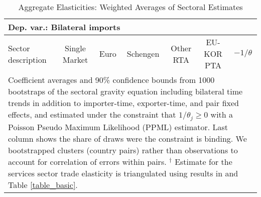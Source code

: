 \documentclass[a4paper,12pt]{article}
\begin{document}
\begin{appendix}
\renewcommand{\tabcolsep}{.2cm}


\begin{table}[t]
\caption{Aggregate Elasticities: Weighted Averages of Sectoral Estimates}
\label{table_wagg}\centering \vspace*{0.5cm}
{\scriptsize
\hspace*{-2cm}\begin{tabular}{lcccccc}
\multicolumn{4}{l}{Dep. var.: Bilateral imports}\\
\toprule
Sector description & Single Market & Euro & Schengen & Other RTA & EU-KOR PTA &  $-1/\theta$\\
\midrule

\bottomrule
\multicolumn{7}{l}{\parbox[t]{5.3in}{Coefficient averages and 90\% confidence bounds from 1000 bootstraps of the sectoral gravity equation including bilateral time trends in addition to importer-time, exporter-time, and pair fixed effects, and estimated under the constraint that $1/\theta_j\geq 0$ with a Poisson Pseudo Maximum Likelihood (PPML) estimator. Last column shows the share of draws were the constraint is binding. We bootstrapped clusters (country pairs) rather than observations to account for correlation of errors within pairs. $^\dagger$ Estimate for the services sector trade elasticity is triangulated using results in \cite{egger2012trade} and Table \ref{table_basic}. }}
\end{tabular}}
\end{table}



\renewcommand{\tabcolsep}{.5cm}




\end{appendix}
\end{document}
